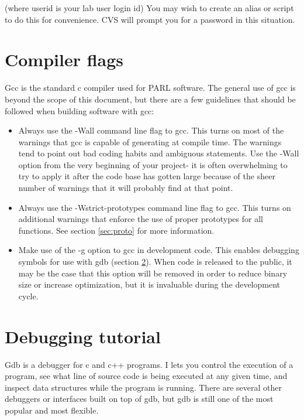 \documentclass[11pt, letterpaper]{article}
\begin{document}
(where userid is your lab user login id)  You may wish to create an
alias or script to do this for convenience.  CVS will prompt you for a
password in this situation.



\section{Compiler flags}
\label{sec:gcc}

Gcc is the standard c compiler used for PARL software.  The general use
of gcc is beyond the scope of this document, but there are a few
guidelines that should be followed when building software with gcc:

\begin{itemize}
	\item Always use the -Wall command line flag to gcc.  This turns on
	most of the warnings that gcc is capable of generating at compile
	time.  The warnings tend to point out
	bad coding habits and ambiguous statements.  Use the -Wall option
	from the very beginning of your project- it is often overwhelming to
	try to apply it after the code base has gotten large because of the
	sheer number of warnings that it will probably find at that point.
	\item Always use the -Wstrict-prototypes command line flag to gcc.
	This turns on additional warnings that enforce the use of proper
	prototypes for all functions.  See section \ref{sec:proto} for more
	information.
	\item Make use of the -g option to gcc in development code.  This enables debugging
	symbols for use with gdb (section \ref{sec:gdb}).  When code is
	released to the public, it may be the case that this option will be
	removed in order to reduce binary size or increase optimization, but
	it is invaluable during the development cycle.
\end{itemize}


\section{Debugging tutorial}
\label{sec:gdb}

Gdb is a debugger for c and c++ programs.  I lets you control the
execution of a program, see what line of source code is being executed
at any given time, and inspect data structures while the program is
running.  There are several other debuggers or interfaces built on top
of gdb, but gdb is still one of the most popular and most flexible.
\end{document}
